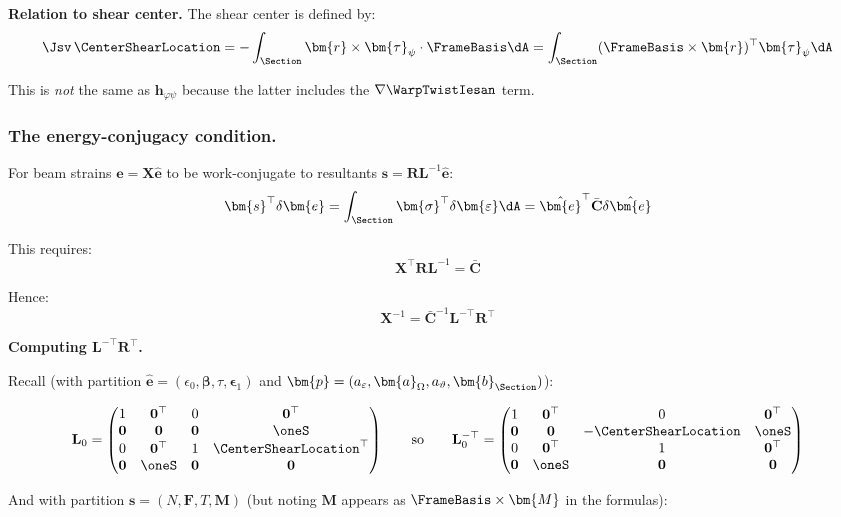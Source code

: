 \textbf{Relation to shear center.} The shear center is defined by:
\[\Jsv\,\CenterShearLocation = -\int_\Section \bm{r} \times \bm{\tau}_\psi \cdot \FrameBasis \dA = \int_\Section (\FrameBasis \times \bm{r})^\top \bm{\tau}_\psi \dA\]

This is \emph{not} the same as \(\mathbf{h}_{\varphi\psi}\) because the
latter includes the \(\nabla\WarpTwistIesan\) term.

\subsubsection{The energy-conjugacy
condition.}\label{the-energy-conjugacy-condition.}

For beam strains \(\bm{e} = \mathbf{X}\hat{\bm{e}}\) to be
work-conjugate to resultants
\(\bm{s} = \mathbf{R}\mathbf{L}^{-1}\hat{\bm{e}}\):
\[\bm{s}^\top \delta\bm{e} = \int_\Section \bm{\sigma}^\top \delta\bm{\varepsilon} \dA = \hat{\bm{e}}^\top \bar{\mathbf{C}} \delta\hat{\bm{e}}\]

This requires:
\[\mathbf{X}^\top \mathbf{R} \mathbf{L}^{-1} = \bar{\mathbf{C}}\]

Hence:
\[\mathbf{X}^{-1} = \bar{\mathbf{C}}^{-1} \mathbf{L}^{-\top} \mathbf{R}^\top\]

\textbf{Computing \(\mathbf{L}^{-\top} \mathbf{R}^\top\).}

Recall (with partition
\(\hat{\bm{e}} = (\epsilon_0, \bm{\beta}, \tau, \bm{\epsilon}_1)\) and
\(\bm{p} = (a_\varepsilon, \bm{a}_\Omega, a_\vartheta, \bm{b}_{\Section})\)):

\[\mathbf{L}_0 = \begin{pmatrix}
1 & \mathbf{0}^\top & 0 & \mathbf{0}^\top \\
\mathbf{0} & \mathbf{0} & \mathbf{0} & \oneS \\
0 & \mathbf{0}^\top & 1 & \CenterShearLocation^\top \\
\mathbf{0} & \oneS & \mathbf{0} & \mathbf{0}
\end{pmatrix}
\qquad\text{so}\qquad 
\mathbf{L}_0^{-\top} = \begin{pmatrix}
1 & \mathbf{0}^\top & 0 & \mathbf{0}^\top \\
\mathbf{0} & \mathbf{0} & -\CenterShearLocation & \oneS \\
0 & \mathbf{0}^\top & 1 & \mathbf{0}^\top \\
\mathbf{0} & \oneS & \mathbf{0} & \mathbf{0}
\end{pmatrix}\]

And with partition \(\bm{s} = (N, \bm{F}, T, \bm{M})\) (but noting
\(\bm{M}\) appears as \(\FrameBasis \times \bm{M}\) in the formulas):

